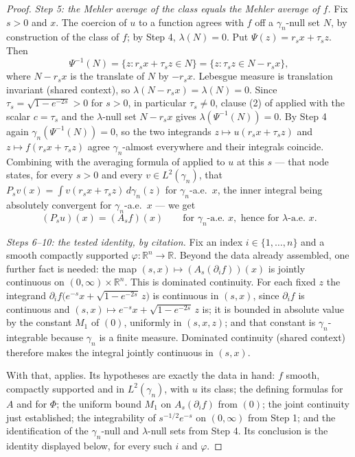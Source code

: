 \begin{proof}
\emph{Step 5: the Mehler average of the class equals the Mehler average of $f$.}
Fix $s > 0$ and $x$.  The coercion of $u$ to a function agrees with $f$ off a
$\gamma_n$-null set $N$, by construction of the class of $f$; by Step 4,
$\lambda(N) = 0$.  Put $\Psi(z) = r_sx+\tau_sz$.  Then
\[
  \Psi^{-1}(N) = \{z : r_sx+\tau_sz \in N\}
    = \{z : \tau_s z \in N - r_sx\} ,
\]
where $N - r_sx$ is the translate of $N$ by $-r_sx$.  Lebesgue measure is
translation invariant (shared context), so $\lambda(N - r_sx) = \lambda(N) = 0$.
Since $\tau_s = \sqrt{1-e^{-2s}} > 0$ for $s > 0$, in particular
$\tau_s \neq 0$, clause (2) of  applied with the
scalar $c = \tau_s$ and the $\lambda$-null set $N - r_sx$ gives
$\lambda(\Psi^{-1}(N)) = 0$.  By Step 4 again $\gamma_n(\Psi^{-1}(N)) = 0$, so
the two integrands $z \mapsto u(r_sx+\tau_sz)$ and $z \mapsto f(r_sx+\tau_sz)$
agree $\gamma_n$-almost everywhere and their integrals coincide.  Combining
with the averaging formula of  applied to $u$ at this
$s$ --- that node states, for every $s>0$ and every $v \in L^2(\gamma_n)$, that
$P_sv(x) = \int v(r_sx+\tau_sz)\,d\gamma_n(z)$ for $\gamma_n$-a.e.\ $x$, the
inner integral being absolutely convergent for $\gamma_n$-a.e.\ $x$ --- we get
\begin{equation*}
  (P_s u)(x) = (A_s f)(x) \qquad\text{for } \gamma_n\text{-a.e. } x,
  \text{ hence for } \lambda\text{-a.e. } x. \tag{2}
\end{equation*}

\emph{Steps 6--10: the tested identity, by citation.}
Fix an index $i \in \{1,\ldots,n\}$ and a smooth compactly supported
$\varphi : \mathbb{R}^n \to \mathbb{R}$.  Beyond the data already assembled, one
further fact is needed: the map $(s,x) \mapsto (A_s(\partial_if))(x)$ is jointly
continuous on $(0,\infty)\times\mathbb{R}^n$.  This is dominated continuity.  For
each fixed $z$ the integrand
$\partial_if\bigl(e^{-s}x + \sqrt{1-e^{-2s}}\,z\bigr)$ is continuous in $(s,x)$,
since $\partial_if$ is continuous and $(s,x) \mapsto e^{-s}x+\sqrt{1-e^{-2s}}\,z$
is; it is bounded in absolute value by the constant $M_1$ of $(0)$, uniformly in
$(s,x,z)$; and that constant is $\gamma_n$-integrable because $\gamma_n$ is a
finite measure.  Dominated continuity (shared context) therefore makes the
integral jointly continuous in $(s,x)$.

With that,  applies.  Its hypotheses are
exactly the data in hand: $f$ smooth, compactly supported and in
$L^2(\gamma_n)$, with $u$ its class; the defining formulas for $A$ and for
$\Phi$; the uniform bound $M_1$ on $A_s(\partial_if)$ from $(0)$; the joint
continuity just established; the integrability of $s^{-1/2}e^{-s}$ on
$(0,\infty)$ from Step 1; and the identification of the $\gamma_n$-null and
$\lambda$-null sets from Step 4.  Its conclusion is the identity displayed
below, for every such $i$ and $\varphi$.


\end{proof}
